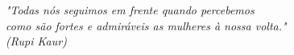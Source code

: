 \begin{epigrafe}
    \vspace*{\fill}
 	\begin{flushright}

		\textit{"Todas nós seguimos em frente quando percebemos\\ como são fortes e admiráveis as mulheres à nossa volta."\\
		(Rupi Kaur)}
	\end{flushright}
\end{epigrafe}
